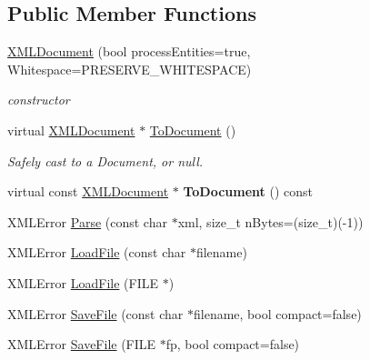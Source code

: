 \subsection*{Public Member Functions}
\begin{DoxyCompactItemize}
\item 
\mbox{\label{classtinyxml2_1_1XMLDocument_af1574f76ebb619f25ef3f09eb2ba5188}} 
\hyperlink{classtinyxml2_1_1XMLDocument_af1574f76ebb619f25ef3f09eb2ba5188}{X\+M\+L\+Document} (bool process\+Entities=true, Whitespace=P\+R\+E\+S\+E\+R\+V\+E\+\_\+\+W\+H\+I\+T\+E\+S\+P\+A\+CE)
\begin{DoxyCompactList}\small\item\em constructor \end{DoxyCompactList}\item 
\mbox{\label{classtinyxml2_1_1XMLDocument_a3e185f880882bd978367bb55937735ec}} 
virtual \hyperlink{classtinyxml2_1_1XMLDocument}{X\+M\+L\+Document} $\ast$ \hyperlink{classtinyxml2_1_1XMLDocument_a3e185f880882bd978367bb55937735ec}{To\+Document} ()
\begin{DoxyCompactList}\small\item\em Safely cast to a Document, or null. \end{DoxyCompactList}\item 
\mbox{\label{classtinyxml2_1_1XMLDocument_a747ab173887d969fe313b4617f968e99}} 
virtual const \hyperlink{classtinyxml2_1_1XMLDocument}{X\+M\+L\+Document} $\ast$ {\bfseries To\+Document} () const
\item 
X\+M\+L\+Error \hyperlink{classtinyxml2_1_1XMLDocument_a1819bd34f540a7304c105a6232d25a1f}{Parse} (const char $\ast$xml, size\+\_\+t n\+Bytes=(size\+\_\+t)(-\/1))
\item 
X\+M\+L\+Error \hyperlink{classtinyxml2_1_1XMLDocument_a2ebd4647a8af5fc6831b294ac26a150a}{Load\+File} (const char $\ast$filename)
\item 
X\+M\+L\+Error \hyperlink{classtinyxml2_1_1XMLDocument_a5f1d330fad44c52f3d265338dd2a6dc2}{Load\+File} (F\+I\+LE $\ast$)
\item 
X\+M\+L\+Error \hyperlink{classtinyxml2_1_1XMLDocument_a73ac416b4a2aa0952e841220eb3da18f}{Save\+File} (const char $\ast$filename, bool compact=false)
\item 
X\+M\+L\+Error \hyperlink{classtinyxml2_1_1XMLDocument_a8b95779479a0035acc67b3a61dfe1b74}{Save\+File} (F\+I\+LE $\ast$fp, bool compact=false)

\end{DoxyCompactItemize}
